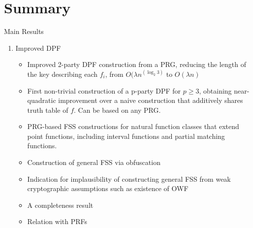 
\clearpage
{}

%
\setcounter{section}{0} %

\section{Summary}
Main Results
\begin{enumerate}
    \item Improved DPF
    \begin{itemize}
        \item Improved 2-party DPF construction from a PRG, reducing the length of the key describing each $f_i$, from $O(\lambda n^(\log_2 3)$ to $O(\lambda n)$
        \item First non-trivial construction of a p-party DPF for $p \ge 3$, obtaining near-quadratic improvement over a naive construction that additively shares truth table of $f$. Can be based on any PRG.
        \item PRG-based FSS constructions for natural function classes that extend point functions, including interval functions and partial matching functions.
        \item Construction of general FSS via obfuscation
        \item Indication for implausibility of constructing general FSS from weak cryptographic assumptions such as existence of OWF
        \item A completeness result
        \item Relation with PRFs
    \end{itemize}
\end{enumerate}

